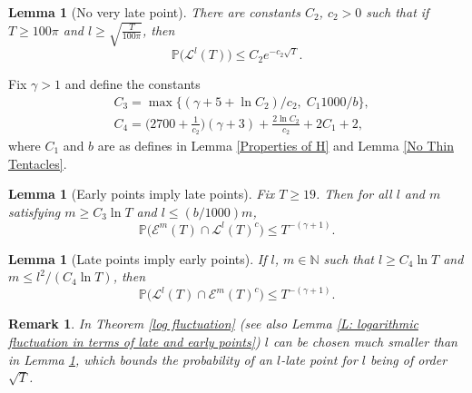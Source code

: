 \documentclass[11pt]{article}
\numberwithin{equation}{section}
\newtheorem{lemma}[theorem]{Lemma}
\newtheorem*{remark}{Remark}
\begin{document}
\begin{lemma}[No very late point] 
  \label{No Very Late Point}
  There are constants $C_2$, $c_2 > 0$ 
  such that if $T \geq 100 \pi$
   and $l \geq \sqrt{\frac{T}{100 \pi}}$, then 
  $$
  \mathbb{P} \big( \mathcal{L}^{l}(T) \big) 
  \leq C_2 e^{-c_2 \sqrt{T}}.
  $$
\end{lemma}

Fix $\gamma > 1$ and define the constants
\begin{equation}\nonumber
  \begin{split}
    &C_3 = \max \{(\gamma + 5 + \ln C_2 )/c_2 ,\; C_1 1000/b \},\\
    &C_4 = \Big(2700 + \frac{1}{c_2} \Big)(\gamma + 3)
      +\frac{2 \ln C_2}{c_2} + 2C_1 +2,
  \end{split}
\end{equation}
where $C_1$ and $b$ are as defines in Lemma \ref{Properties of H} 
and Lemma \ref{No Thin Tentacles}.

\begin{lemma}[Early points imply late points]
  \label{Early Points Imply Late Points}
  Fix $T \geq 19$. Then for all $l$ and $m$ 
  satisfying $m \geq C_3 \ln T$ and $l \leq (b/1000)m$, 
  $$
  \mathbb{P} \big( \mathcal{E}^m(T) \cap \mathcal{L}^l(T)^c \big)
  \leq T^{-(\gamma + 1)}.
  $$
\end{lemma}

\begin{lemma}[Late points imply early points]
  \label{Late Points Imply Early Points}
  If $l$, $m \in \mathbb{N}$ 
  such that \hbox{$l \geq C_4 \ln T$} and 
  \mbox{$m \leq l^2 / (C_4 \ln T)$}, then 
  $$
  \mathbb{P} \big( \mathcal{L}^l(T) \cap \mathcal{E}^m(T)^c \big) 
    \leq T^{-(\gamma + 1)}.
  $$
\end{lemma}

\begin{remark}
  In Theorem \ref{log fluctuation} 
  (see also Lemma \ref{L: logarithmic fluctuation in terms of late and early points})
  $l$ can be chosen much smaller than 
  in Lemma \ref{No Very Late Point}, which bounds 
  the probability of an $l$-late point for $l$ being of order $\sqrt{T}$.
\end{remark}
\end{document}
